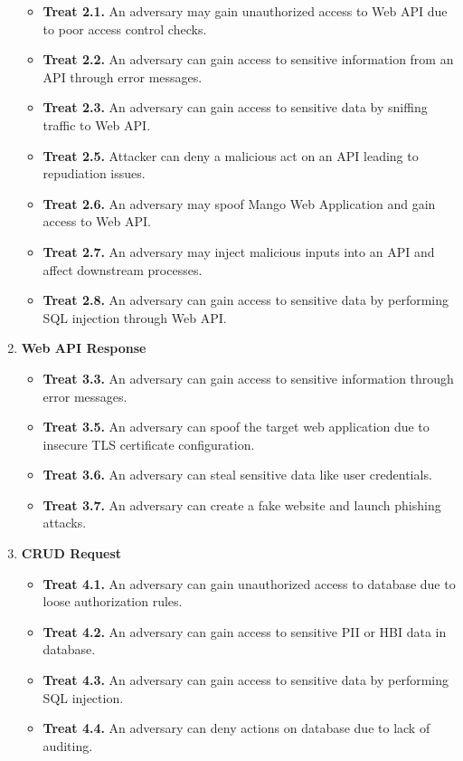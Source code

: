\begin{enumerate}
\begin{itemize}
        \item \textbf{Treat 2.1.} An adversary may gain unauthorized access to Web API due to poor access control checks.
        \item \textbf{Treat 2.2.} An adversary can gain access to sensitive information from an API through error messages.
        \item \textbf{Treat 2.3.} An adversary can gain access to sensitive data by sniffing traffic to Web API\@.
        \item \textbf{Treat 2.5.} Attacker can deny a malicious act on an API leading to repudiation issues.
        \item \textbf{Treat 2.6.} An adversary may spoof Mango Web Application and gain access to Web API\@.
        \item \textbf{Treat 2.7.} An adversary may inject malicious inputs into an API and affect downstream processes.
        \item \textbf{Treat 2.8.} An adversary can gain access to sensitive data by performing SQL injection through Web API\@.
    \end{itemize}
    \item \textbf{Web API Response}
    \begin{itemize}
        \item \textbf{Treat 3.3.} An adversary can gain access to sensitive information through error messages.
        \item \textbf{Treat 3.5.} An adversary can spoof the target web application due to insecure TLS certificate configuration.
        \item \textbf{Treat 3.6.} An adversary can steal sensitive data like user credentials.
        \item \textbf{Treat 3.7.} An adversary can create a fake website and launch phishing attacks.
    \end{itemize}
    \item \textbf{CRUD Request}
    \begin{itemize}
        \item \textbf{Treat 4.1.} An adversary can gain unauthorized access to database due to loose authorization rules.
        \item \textbf{Treat 4.2.} An adversary can gain access to sensitive PII or HBI data in database.
        \item \textbf{Treat 4.3.} An adversary can gain access to sensitive data by performing SQL injection.
        \item \textbf{Treat 4.4.} An adversary can deny actions on database due to lack of auditing.

\end{itemize}
\end{enumerate}
